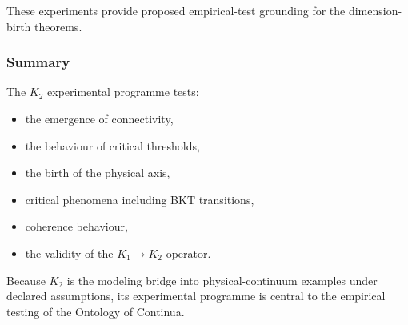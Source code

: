 These experiments provide proposed empirical-test grounding for the
dimension-birth theorems.



\subsubsection{Summary}

The $K_2$ experimental programme tests:

\begin{itemize}
    \item the emergence of connectivity,
    \item the behaviour of critical thresholds,
    \item the birth of the physical axis,
    \item critical phenomena including BKT transitions,
    \item coherence behaviour,
    \item the validity of the $K_1\rightarrow K_2$ operator.
\end{itemize}

Because $K_2$ is the modeling bridge into physical-continuum examples under declared assumptions,
its experimental programme is central to the empirical testing of the
Ontology of Continua.
